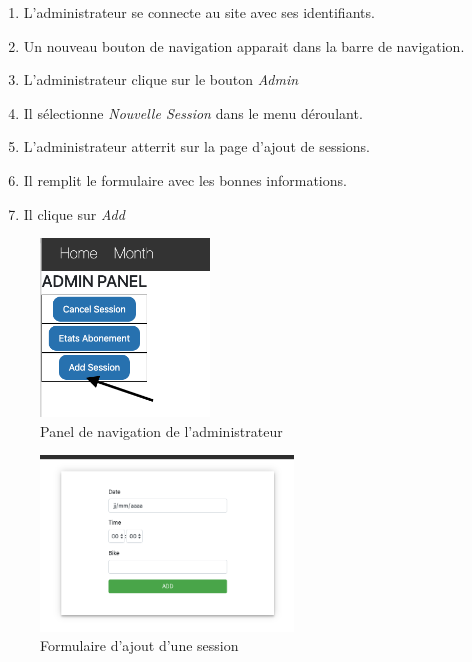 \begin{enumerate}
	\item L'administrateur se connecte au site avec ses identifiants. 
	\item Un nouveau bouton de navigation apparait dans la barre de navigation. 
	\item L'administrateur clique sur le bouton \textit{Admin}
	\item Il sélectionne \textit{Nouvelle Session} dans le menu déroulant. 
	\item L'administrateur atterrit sur la page d'ajout de sessions. 
	\item Il remplit le formulaire avec les bonnes informations.
	\item Il clique sur \textit{Add}
\end{enumerate}

\vspace{\baselineskip}
\begin{figure}[h]
	\includegraphics[width=0.4\textwidth,center]{Figures/us10-1}
	\caption{Panel de navigation de l'administrateur}
\end{figure}

\vspace{\baselineskip}
\begin{figure}[h]
	\includegraphics[width=0.6\textwidth,center]{Figures/us10-2}
	\caption{Formulaire d'ajout d'une session}
\end{figure}

